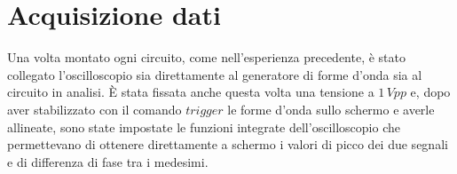 \section{Acquisizione dati}
Una volta montato ogni circuito, come nell'esperienza precedente, è stato collegato l'oscilloscopio sia direttamente al generatore di forme d'onda sia al circuito in analisi. 
\`E stata fissata anche questa volta una tensione a $1\,Vpp$ e, dopo aver stabilizzato con il comando $trigger$ le forme d'onda sullo schermo e averle allineate, sono state impostate le funzioni integrate dell'oscilloscopio che permettevano di ottenere direttamente a schermo i valori di picco dei due segnali e di differenza di fase tra i medesimi.\phantom{maperchédevosempreognivoltamettereapostolecoseconunphantom?melospieghi?chestoria!}